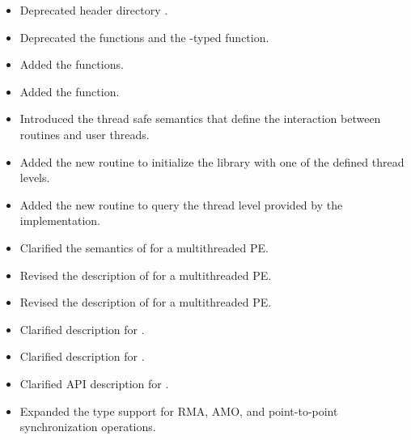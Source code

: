 \begin{itemize}
%
%
\item Deprecated header directory .
%
%
\item Deprecated the  functions and the -typed \CorCpp {} function.
%
%
\item Added the  functions.
%
%
\item Added the  function.
%
%
\item Introduced the thread safe semantics that define the interaction between
    \openshmem routines and user threads.
%
%
\item Added the new routine  to initialize the
    \openshmem library with one of the defined thread levels.
%
%
\item Added the new routine  to query the thread
    level provided by the \openshmem implementation.
%
%
\item Clarified the semantics of  for a multithreaded
    \openshmem \ac{PE}.
%
%
\item Revised the description of  for a multithreaded
    \openshmem \ac{PE}.
%
%
\item Revised the description of  for a multithreaded
    \openshmem \ac{PE}.
%
%
\item Clarified description for .
%
%
\item Clarified description for .
%
%
\item Clarified \ac{API} description for .
%
%
\item Expanded the type support for \ac{RMA}, \ac{AMO}, and point-to-point
    synchronization operations.

\end{itemize}
